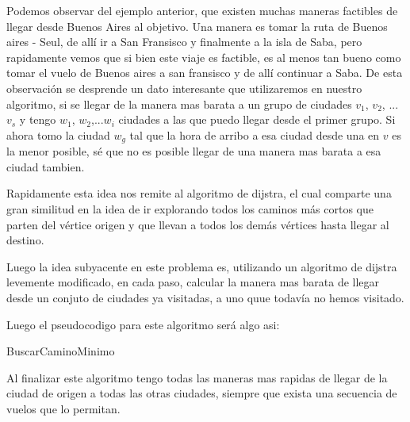 Podemos observar del ejemplo anterior, que existen muchas maneras factibles de llegar desde Buenos Aires al objetivo. Una manera es tomar la ruta de Buenos aires - Seul, de allí ir a San Fransisco y finalmente a la isla de Saba, pero rapidamente vemos que si bien este viaje es factible, es al menos tan bueno como tomar el vuelo de Buenos aires a san fransisco y de allí continuar a Saba. De esta observación se desprende un dato interesante que utilizaremos en nuestro algoritmo, si se llegar de la manera mas barata a un grupo de ciudades $v_1$, $v_2$, ... $v_s$ y tengo $w_1$, $w_2$,...$w_i$ ciudades a las que puedo llegar desde el primer grupo. Si ahora tomo la ciudad $w_g$ tal que la hora de arribo a esa ciudad desde una en $v$ es la menor posible, sé que no es posible llegar de una manera mas barata a esa ciudad tambien.

Rapidamente esta idea nos remite al algoritmo de dijstra, el cual comparte una gran similitud en la idea de ir explorando todos los caminos más cortos que parten del vértice origen y que llevan a todos los demás vértices hasta llegar al destino.

Luego la idea subyacente en este problema es, utilizando un algoritmo de dijstra levemente modificado, en cada paso, calcular la manera mas barata de llegar desde un conjuto de ciudades ya visitadas, a uno quue todavía no hemos visitado.

Luego el pseudocodigo para este algoritmo será algo asi:

\begin{algorithm}
  \begin{algorithmic}[1]\parskip=1mm
 \caption{ BuscarCaminoMinimo}

  \end{algorithmic}
  \end{algorithm}	
Al finalizar este algoritmo tengo todas las maneras mas rapidas de llegar de la ciudad de origen a todas las otras ciudades, siempre que exista una secuencia de vuelos que lo permitan.

